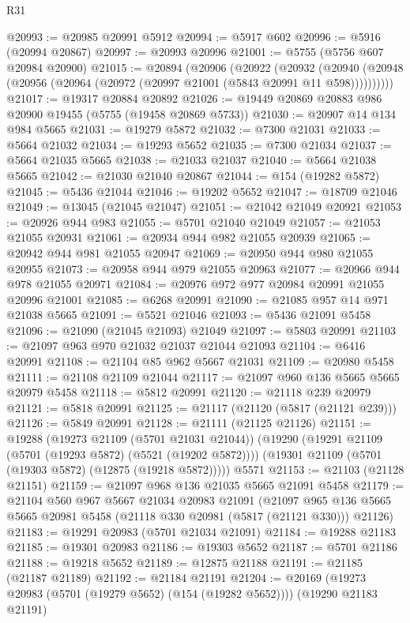 \begin{lexlean}{R31}
\begin{coremodule}
@20993 := @20985 @20991 @5912
@20994 := @5917 @602
@20996 := @5916 (@20994 @20867)
@20997 := @20993 @20996
@21001 := @5755 (@5756 @607 @20984 @20900)
@21015 := @20894
    (@20906
      (@20922
        (@20932
          (@20940 (@20948 (@20956 (@20964 (@20972 (@20997 @21001 (@5843 @20991 @11 @598))))))))))
@21017 := @19317 @20884 @20892
@21026 := @19449 @20869 @20883 @986 @20900 @19455 (@5755 (@19458 @20869 @5733))
@21030 := @20907 @14 @134 @984 @5665
@21031 := @19279 @5872
@21032 := @7300 @21031
@21033 := @5664 @21032
@21034 := @19293 @5652
@21035 := @7300 @21034
@21037 := @5664 @21035 @5665
@21038 := @21033 @21037
@21040 := @5664 @21038 @5665
@21042 := @21030 @21040 @20867
@21044 := @154 (@19282 @5872)
@21045 := @5436 @21044
@21046 := @19202 @5652
@21047 := @18709 @21046
@21049 := @13045 (@21045 @21047)
@21051 := @21042 @21049 @20921
@21053 := @20926 @944 @983
@21055 := @5701 @21040 @21049
@21057 := @21053 @21055 @20931
@21061 := @20934 @944 @982 @21055 @20939
@21065 := @20942 @944 @981 @21055 @20947
@21069 := @20950 @944 @980 @21055 @20955
@21073 := @20958 @944 @979 @21055 @20963
@21077 := @20966 @944 @978 @21055 @20971
@21084 := @20976 @972 @977 @20984 @20991 @21055 @20996 @21001
@21085 := @6268 @20991
@21090 := @21085 @957 @14 @971 @21038 @5665
@21091 := @5521 @21046
@21093 := @5436 @21091 @5458
@21096 := @21090 (@21045 @21093) @21049
@21097 := @5803 @20991
@21103 := @21097 @963 @970 @21032 @21037 @21044 @21093
@21104 := @6416 @20991
@21108 := @21104 @85 @962 @5667 @21031
@21109 := @20980 @5458
@21111 := @21108 @21109 @21044
@21117 := @21097 @960 @136 @5665 @5665 @20979 @5458
@21118 := @5812 @20991
@21120 := @21118 @239 @20979
@21121 := @5818 @20991
@21125 := @21117 (@21120 (@5817 (@21121 @239)))
@21126 := @5849 @20991
@21128 := @21111 (@21125 @21126)
@21151 := @19288
    (@19273 @21109 (@5701 @21031 @21044))
    (@19290
      (@19291 @21109 (@5701 (@19293 @5872) (@5521 (@19202 @5872))))
      (@19301 @21109 (@5701 (@19303 @5872) (@12875 (@19218 @5872)))))
    @5571
@21153 := @21103 (@21128 @21151)
@21159 := @21097 @968 @136 @21035 @5665 @21091 @5458
@21179 := @21104
    @560
    @967
    @5667
    @21034
    @20983
    @21091
    (@21097 @965 @136 @5665 @5665 @20981 @5458 (@21118 @330 @20981 (@5817 (@21121 @330))) @21126)
@21183 := @19291 @20983 (@5701 @21034 @21091)
@21184 := @19288 @21183
@21185 := @19301 @20983
@21186 := @19303 @5652
@21187 := @5701 @21186
@21188 := @19218 @5652
@21189 := @12875 @21188
@21191 := @21185 (@21187 @21189)
@21192 := @21184 @21191
@21204 := @20169
    (@19273 @20983 (@5701 (@19279 @5652) (@154 (@19282 @5652))))
    (@19290 @21183 @21191)

\end{coremodule}
\end{lexlean}
